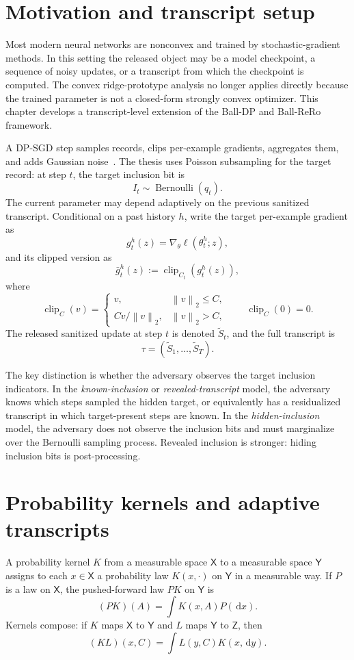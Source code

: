 \documentclass[11pt,a4paper]{report}
\theoremstyle{plain}
\theoremstyle{definition}
\theoremstyle{remark}
\DeclareMathOperator{\clip}{clip}
\DeclareMathOperator{\Ber}{Bernoulli}
\newcommand{\dd}{\,\mathrm d}
\newcommand{\norm}[1]{\left\lVert #1\right\rVert}
\begin{document}
\section{Motivation and transcript setup}
\label{sec:transcript-setup}

Most modern neural networks are nonconvex and trained by stochastic-gradient methods.  In this setting the released object may be a model checkpoint, a sequence of noisy updates, or a transcript from which the checkpoint is computed.  The convex ridge-prototype analysis no longer applies directly because the trained parameter is not a closed-form strongly convex optimizer.  This chapter develops a transcript-level extension of the Ball-DP and Ball-ReRo framework.

A DP-SGD step samples records, clips per-example gradients, aggregates them, and adds Gaussian noise~\cite{abadi2016}.  The thesis uses Poisson subsampling for the target record: at step $t$, the target inclusion bit is
\[
I_t\sim\Ber(q_t).
\]
The current parameter may depend adaptively on the previous sanitized transcript.  Conditional on a past history $h$, write the target per-example gradient as
\[
g_t^h(z)=\nabla_\theta\ell(\theta_t^h;z),
\]
and its clipped version as
\[
\bar g_t^h(z):=\clip_{C_t}(g_t^h(z)),
\]
where
\[
\clip_C(v)=
\begin{cases}
v,& \norm{v}_2\le C,\\
Cv/\norm{v}_2,& \norm{v}_2>C,
\end{cases}
\qquad \clip_C(0)=0.
\]
The released sanitized update at step $t$ is denoted $\widetilde S_t$, and the full transcript is
\[
\tau=(\widetilde S_1,\ldots,\widetilde S_T).
\]

The key distinction is whether the adversary observes the target inclusion indicators.  In the \emph{known-inclusion} or \emph{revealed-transcript} model, the adversary knows which steps sampled the hidden target, or equivalently has a residualized transcript in which target-present steps are known.  In the \emph{hidden-inclusion} model, the adversary does not observe the inclusion bits and must marginalize over the Bernoulli sampling process.  Revealed inclusion is stronger: hiding inclusion bits is post-processing.

\section{Probability kernels and adaptive transcripts}
\label{sec:kernels}

A probability kernel $K$ from a measurable space $\mathsf X$ to a measurable space $\mathsf Y$ assigns to each $x\in\mathsf X$ a probability law $K(x,\cdot)$ on $\mathsf Y$ in a measurable way.  If $P$ is a law on $\mathsf X$, the pushed-forward law $PK$ on $\mathsf Y$ is
\[
(PK)(A)=\int K(x,A)P(\dd x).
\]
Kernels compose: if $K$ maps $\mathsf X$ to $\mathsf Y$ and $L$ maps $\mathsf Y$ to $\mathsf Z$, then
\[
(KL)(x,C)=\int L(y,C)K(x,\dd y).
\]
\end{document}
